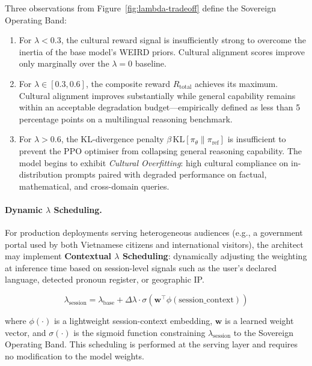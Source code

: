 Three observations from Figure~\ref{fig:lambda-tradeoff} define
the Sovereign Operating Band:

\begin{enumerate}
  \item For $\lambda < 0.3$, the cultural reward signal is
    insufficiently strong to overcome the inertia of the base
    model's WEIRD priors.
    Cultural alignment scores improve only marginally over the
    $\lambda = 0$ baseline.

  \item For $\lambda \in [0.3, 0.6]$, the composite reward
    $R_{\mathrm{total}}$ achieves its maximum.
    Cultural alignment improves substantially while general
    capability remains within an acceptable degradation
    budget---empirically defined as less than 5 percentage points
    on a multilingual reasoning benchmark.

  \item For $\lambda > 0.6$, the KL-divergence penalty
    $\beta\,\mathrm{KL}[\pi_\theta \| \pi_{\mathrm{ref}}]$ is
    insufficient to prevent the PPO optimiser from collapsing
    general reasoning capability.
    The model begins to exhibit \emph{Cultural Overfitting}:
    high cultural compliance on in-distribution prompts paired
    with degraded performance on factual, mathematical, and
    cross-domain queries.
\end{enumerate}

\paragraph{Dynamic $\lambda$ Scheduling.}
For production deployments serving heterogeneous audiences
(e.g., a government portal used by both Vietnamese citizens and
international visitors), the architect may implement
\textbf{Contextual $\lambda$ Scheduling}: dynamically adjusting
the weighting at inference time based on session-level signals
such as the user's declared language, detected pronoun register,
or geographic IP.

\begin{equation}
  \label{eq:lambda-schedule}
  \lambda_{\mathrm{session}}
    = \lambda_{\mathrm{base}}
    + \Delta\lambda \cdot \sigma\!\left(
        \mathbf{w}^{\top} \phi(\mathrm{session\_context})
      \right)
\end{equation}

where $\phi(\cdot)$ is a lightweight session-context embedding,
$\mathbf{w}$ is a learned weight vector, and $\sigma(\cdot)$ is
the sigmoid function constraining $\lambda_{\mathrm{session}}$ to
the Sovereign Operating Band.
This scheduling is performed at the serving layer and requires no
modification to the model weights.

